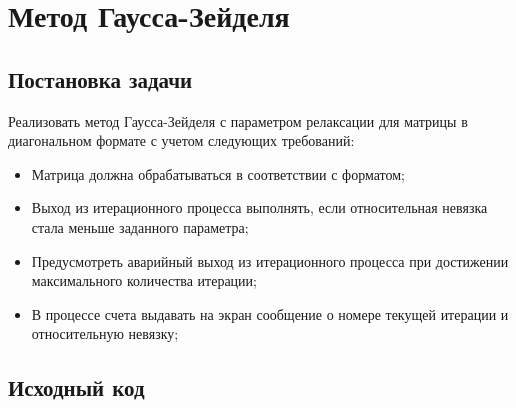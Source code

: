 \documentclass[12pt, a4paper]{article}
\begin{document}
\newpage

\section{Метод Гаусса-Зейделя}
\subsection{Постановка задачи}
Реализовать метод Гаусса-Зейделя с параметром релаксации для матрицы в 
диагональном формате с учетом следующих требований:

\begin{itemize}
  \item Матрица должна обрабатываться в соответствии с форматом;
  \item Выход из итерационного процесса выполнять, если относительная 
    невязка стала меньше заданного параметра;
  \item Предусмотреть аварийный выход из итерационного процесса при достижении 
    максимального количества итерации;
  \item В процессе счета выдавать на экран сообщение о номере текущей итерации 
    и относительную невязку;
\end{itemize}

\subsection{Исходный код}
\end{document}
